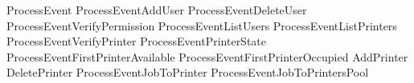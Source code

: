\begin{zed}
ProcessEvent
             \sdef ProcessEventAddUser
             \lor ProcessEventDeleteUser
             \lor ProcessEventVerifyPermission
             \lor ProcessEventListUsers
             \lor ProcessEventListPrinters
             \lor ProcessEventVerifyPrinter
             \lor ProcessEventPrinterState
             \lor ProcessEventFirstPrinterAvailable
             \lor ProcessEventFirstPrinterOccupied
             \lor AddPrinter
             \lor DeletePrinter
             \lor ProcessEventJobToPrinter
             \lor ProcessEventJobToPrintersPool
\end{zed}

